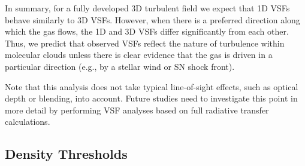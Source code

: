In summary, 
for a fully developed 3D turbulent field we expect that 1D VSFs behave similarly to 3D VSFs.
However, when there is a preferred direction along which the gas flows, the 1D and 3D VSFs differ significantly from each other. 
Thus, we predict that observed VSFs reflect the nature of turbulence within molecular clouds unless there is clear evidence that the gas is driven in a particular direction (e.g., by 
     a stellar wind 
or SN shock front).

Note that this analysis does not take typical line-of-sight effects, such as optical depth or blending, into account. 
Future studies need to investigate this point in more detail by performing 
    VSF analyses based on 
full radiative transfer calculations. 

\subsection{Density Thresholds}\label{discussion:densthres}


